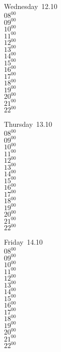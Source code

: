 \documentclass[11pt,a4paper]{book}\usepackage[]{graphicx}\usepackage[]{color}
\begin{document}
\begin{weekdaybox}
  Wednesday~12.10\\
  { 
  \vfill
  $08^{00}$\\
$09^{00}$\\
$10^{00}$\\
$11^{00}$\\
$12^{00}$\\
$13^{00}$\\
$14^{00}$\\
$15^{00}$\\
$16^{00}$\\
$17^{00}$\\
$18^{00}$\\
$19^{00}$\\
$20^{00}$\\
$21^{00}$\\
$22^{00}$\\
  }
\end{weekdaybox}
\clearpage
\begin{headerbox}
\end{headerbox}
\begin{weekdaybox}
  Thursday~13.10\\
  { 
  \vfill
  $08^{00}$\\
$09^{00}$\\
$10^{00}$\\
$11^{00}$\\
$12^{00}$\\
$13^{00}$\\
$14^{00}$\\
$15^{00}$\\
$16^{00}$\\
$17^{00}$\\
$18^{00}$\\
$19^{00}$\\
$20^{00}$\\
$21^{00}$\\
$22^{00}$\\
  }
\end{weekdaybox} 
\begin{weekdaybox}
  Friday~14.10\\
  { 
  \vfill
  $08^{00}$\\
$09^{00}$\\
$10^{00}$\\
$11^{00}$\\
$12^{00}$\\
$13^{00}$\\
$14^{00}$\\
$15^{00}$\\
$16^{00}$\\
$17^{00}$\\
$18^{00}$\\
$19^{00}$\\
$20^{00}$\\
$21^{00}$\\
$22^{00}$\\
  }
\end{weekdaybox}
\end{document}

